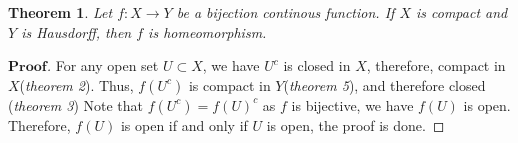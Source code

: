 \documentclass[a4paper, 11pt]{article}
\newtheorem{theorem}{Theorem}
\theoremstyle{definition}
\theoremstyle{remark}
\newenvironment{myprf}
{\renewcommand\qedsymbol{$ $}\begin{proof}[$\mathbf{Proof}$]}
  {\end{proof}}
\theoremstyle{definition}
\begin{document}
\vspace{0.5cm}
\begin{theorem}
        Let $f:X\rightarrow Y$ be a bijection continous function. If $X$ is 
        compact and $Y$ is Hausdorff, then $f$ is homeomorphism.
\end{theorem}
\begin{myprf}
        For any open set $U\subset X$, we have $U^{c}$ is closed in $X$,
        therefore, compact in $X$(\textit{theorem 2}). Thus, $f(U^{c})$ is compact
        in $Y$(\textit{theorem 5}), and therefore closed (\textit{theorem 3})
        Note that $f(U^{c})=f(U)^{c}$ as $f$ is bijective, we have $f(U)$ is open.
        Therefore, $f(U)$ is open if and only if $U$ is open, the proof is done.
\end{myprf}
\end{document}
